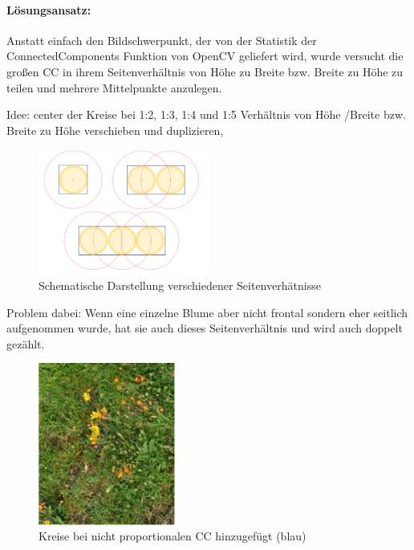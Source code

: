 \paragraph{Lösungsansatz:}
Anstatt einfach den Bildschwerpunkt, der von der Statistik der ConnectedComponents Funktion von OpenCV geliefert wird, wurde versucht die großen CC in ihrem Seitenverhältnis von Höhe zu Breite bzw. Breite zu Höhe zu teilen und mehrere Mittelpunkte anzulegen. 

Idee: center der Kreise bei 1:2, 1:3, 1:4 und 1:5 Verhältnis von Höhe /Breite bzw. Breite zu Höhe verschieben und duplizieren,


\begin{figure}[htb]
 \centering
 \includegraphics[width=0.5\textwidth,angle=0]{abb/ergebnisse/probleme/seitenverhaeltnis}
 \caption{Schematische Darstellung verschiedener Seitenverhätnisse}
\label{fig:Schema}
\end{figure}


Problem dabei: Wenn eine einzelne Blume aber nicht frontal sondern eher seitlich aufgenommen wurde, hat sie auch dieses Seitenverhältnis und wird auch doppelt gezählt.

\begin{figure}[htb]
 \centering
 \includegraphics[width=0.4\textwidth,angle=0]{abb/ergebnisse/probleme/circles}
 \caption{Kreise bei nicht proportionalen CC hinzugefügt (blau)}
\label{fig:Kreis-blau}
\end{figure}

